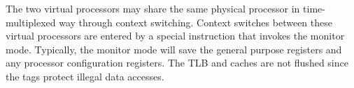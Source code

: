     The two virtual processors may share the same physical processor in 
    time-multiplexed way through context switching. Context switches between 
    these virtual processors are entered by a special instruction that invokes 
    the monitor mode.  Typically, the monitor mode will save the general 
    purpose registers and any processor configuration registers. The TLB and 
    caches are not flushed since the tags protect illegal data accesses.

